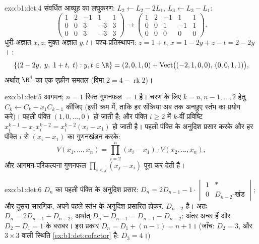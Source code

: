 \begin{solution}{exo:b1:det:4}
संवर्धित आव्यूह का लघुकरण: $L_2 \leftarrow L_2 - 2L_1$, $L_3 \leftarrow L_3
- L_1$:
\[
\begin{pmatrix}
1 & 2 & -1 & 1 & 1\\
0 & 0 & 3 & -3 & 3\\
0 & 0 & 3 & -3 & 3
\end{pmatrix}
\to
\begin{pmatrix}
1 & 2 & -1 & 1 & 1\\
0 & 0 & 1 & -1 & 1\\
0 & 0 & 0 & 0 & 0
\end{pmatrix}.
\]
धुरी-अज्ञात $x, z$; मुक्त अज्ञात $y, t$। पश्च-प्रतिस्थापन: $z = 1 + t$, $x =
1 - 2y + z - t = 2 - 2y$। :
\[
\{(2 - 2y,\; y,\; 1 + t,\; t) : y, t \in \R\}
= (2, 0, 1, 0) + \operatorname{Vect}\bigl((-2,1,0,0),\,
(0,0,1,1)\bigr),
\]
अर्थात् $\R^4$ का एक एफ़ीन समतल (विमा $2 = 4 - \operatorname{rk} 2$)।
\end{solution}

\begin{solution}{exo:b1:det:5}
आगमन; $n = 1$ रिक्त गुणनफल $= 1$ है। चरण के लिए $k = n, n-1, \dots, 2$ हेतु
$C_k \leftarrow C_k - x_1 C_{k-1}$ कीजिए (इसी क्रम में, ताकि हर संक्रिया अब
तक अनछुए स्तंभ का प्रयोग करे)। पहली पंक्ति $(1, 0, \dots, 0)$ हो जाती है; और
पंक्ति $i \geq 2$ में $k$-वीं प्रविष्टि $x_i^{k-1} - x_1 x_i^{k-2} =
x_i^{k-2}(x_i - x_1)$ हो जाती है। पहली पंक्ति के अनुदिश प्रसार करके और हर
पंक्ति $i$ से $(x_i - x_1)$ का गुणनखंडन करके:
\[
V(x_1, \dots, x_n)
= \prod_{i=2}^{n} (x_i - x_1)\cdot V(x_2, \dots, x_n),
\]
और आगमन-परिकल्पना गुणनफल $\prod_{i<j}(x_j - x_i)$ पूरा कर देती है।
\end{solution}

\begin{solution}{exo:b1:det:6}
$D_n$ का पहली पंक्ति के अनुदिश प्रसार: $D_n = 2 D_{n-1} -
1\cdot\begin{vmatrix} 1 & \ast\\ 0 & D_{n-2}\text{-खंड} \end{vmatrix}$; और
दूसरा सारणिक, अपने पहले स्तंभ के अनुदिश प्रसारित होकर, $D_{n-2}$ है। अतः
$D_n = 2D_{n-1} - D_{n-2}$, अर्थात् $D_n - D_{n-1} = D_{n-1} - D_{n-2}$:
अंतर अचर हैं और $D_2 - D_1 = 1$ के बराबर। इस प्रकार $D_n = D_1 + (n - 1) = n
+ 1$। (जाँच: $D_2 = 3$, और $3\times3$ वाली स्थिति \cref{ex:b1:det:cofactor}
है: $D_3 = 4$।)
\end{solution}

